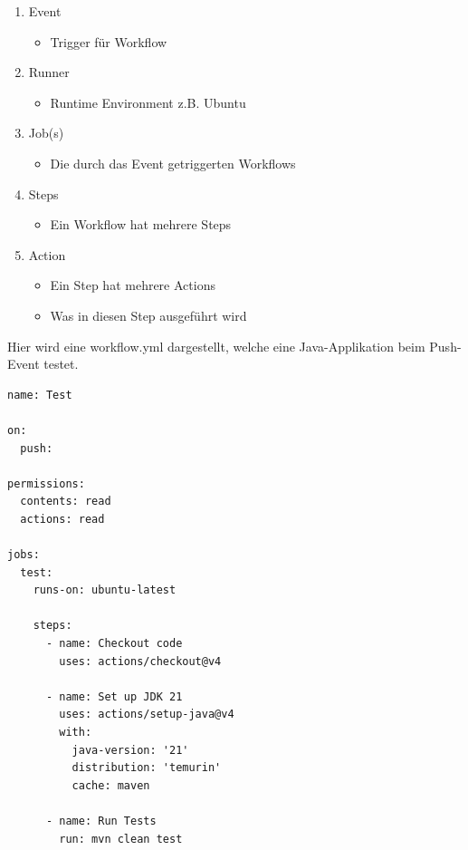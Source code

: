 \documentclass[
    headings=optiontotocandhead,%
    twoside,
    numbers=noenddot,%
    12pt, %
    titlepage, %
    parskip=full, %
    listof=leveldown, 
    numbers=noenddot, %
    a4paper,DIV=14,
    BCOR=15mm,
]{scrbook}
\providecommand{\tightlist}{%
  \setlength{\itemsep}{0pt}\setlength{\parskip}{0pt}}
\begin{document}
\begin{enumerate}
\def\labelenumi{\arabic{enumi}.}
\tightlist
\item
  Event

  \begin{itemize}
  \tightlist
  \item
    Trigger für Workflow
  \end{itemize}
\item
  Runner

  \begin{itemize}
  \tightlist
  \item
    Runtime Environment z.B. Ubuntu
  \end{itemize}
\item
  Job(s)

  \begin{itemize}
  \tightlist
  \item
    Die durch das Event getriggerten Workflows
  \end{itemize}
\item
  Steps

  \begin{itemize}
  \tightlist
  \item
    Ein Workflow hat mehrere Steps
  \end{itemize}
\item
  Action

  \begin{itemize}
  \tightlist
  \item
    Ein Step hat mehrere Actions
  \item
    Was in diesen Step ausgeführt wird
  \end{itemize}
\end{enumerate}

Hier wird eine workflow.yml dargestellt, welche eine Java-Applikation
beim Push-Event testet.

\begin{lstlisting}[caption={Beispiel einer GitHub Action}]
name: Test

on:
  push:

permissions:
  contents: read
  actions: read

jobs:
  test:
    runs-on: ubuntu-latest

    steps:
      - name: Checkout code
        uses: actions/checkout@v4

      - name: Set up JDK 21
        uses: actions/setup-java@v4
        with:
          java-version: '21'
          distribution: 'temurin'
          cache: maven

      - name: Run Tests
        run: mvn clean test
\end{lstlisting}
\end{document}
